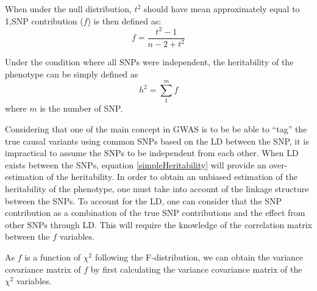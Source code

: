 \documentclass{book}
\begin{document}
		When under the null distribution, $t^2$ should have mean approximately equal to 1,\acrshort{SNP} contribution ($f$) is then defined as:
		\begin{equation}
		f = \frac{t^2-1}{n-2+t^2}
		\label{snpContribution}
		\end{equation} 
		
		Under the condition where all \acrshort{SNP}s were independent, the heritability of the phenotype can be simply defined as 
		\begin{equation}
			h^2 = \sum^m_1{f}
			\label{simpleHeritability}
		\end{equation}
		where $m$ is the number of \acrshort{SNP}.
		
		Considering that one of the main concept in \acrshort{GWAS} is to be be able to ``tag'' the true causal variants using common \acrshort{SNP}s based on the \acrfull{LD} between the \acrshort{SNP}, it is impractical to assume the \acrshort{SNP}s to be independent from each other. 
		When \acrshort{LD} exists between the \acrshort{SNP}s, equation \ref{simpleHeritability} will provide an over-estimation of the heritability. 
		In order to obtain an unbiased estimation of the heritability of the phenotype, one must take into account of the linkage structure between the \acrshort{SNP}s.
		To account for the \acrshort{LD}, one can consider that the \acrshort{SNP} contribution as a combination of the true \acrshort{SNP} contributions and the effect from other \acrshort{SNP}s through \acrshort{LD}.
		This will require the knowledge of the correlation matrix between the $f$ variables.
		
		As $f$ is a function of $\chi^2$ following the F-distribution, we can obtain the variance covariance matrix of $f$ by first calculating the variance covariance matrix of the $\chi^2$ variables.
		
\end{document}

